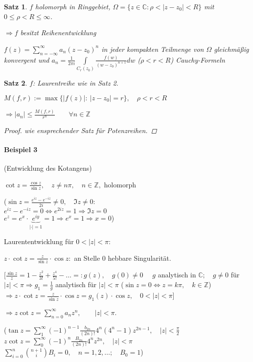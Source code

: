 \documentclass[ngerman,halfparskip]{scrartcl}
\newtheorem{satz}{Satz}[section]
\theoremstyle{definition}
\def\C{\mathbb C}
\def\Z{\mathbb Z}
\begin{document}
\begin{satz}
$f$ holomorph in Ringgebiet, $\Omega=\{z\in\C:\rho<|z-z_0|<R\}$ mit $0\leq\rho<R\leq\infty$.

$\Rightarrow f$ besitzt Reihenentwicklung

$f(z)=\sum\limits_{n=-\infty}^\infty a_{n}{(z-z_0)^n}$ in jeder kompakten Teilmenge von $\Omega$ gleichmäßig konvergent und $a_n=\frac 1 {2\pi i} \int\limits_{C_r(z_0)}\frac {f(w)}{(w-z_0)^{n+1}}dw$ ($\rho<r<R$) Cauchy-Formeln
\end{satz}

\begin{satz}
$f$: Laurentreihe wie in Satz 2. 

$M(f,r):=\max \{|f(z)|: ~|z-z_0|=r\}, \quad \rho<r<R$

$\Rightarrow |a_n|\leq \frac {M(f,r)}{r^n} \qquad \forall n\in\Z$
\begin{proof}
wie ensprechender Satz für Potenzreihen.
\end{proof}

\end{satz} 


\paragraph{Beispiel 3} (Entwicklung des Kotangens) 

$\cot z=\frac {\cos z}{\sin z}, \quad z\neq n\pi, \quad n\in\Z,$ holomorph

($\sin z=\frac{e^{iz}-e^{-iz}}{2i}\neq 0,\quad \Im z\neq 0:$\\
$e^{iz}-e^{-iz}=0 \Leftrightarrow e^{2iz}=1 \Rightarrow \Im z=0$\\
$e^z=e^x\cdot \underbrace {e^{iy}}_{|\cdot|=1}=1 \Rightarrow e^x=1 \Rightarrow x=0$)

Laurententwicklung für $0<|z|<\pi:$

$z\cdot \cot z=\frac z{\sin z}\cdot \cos z:$ an Stelle $0$ hebbare Singularität.

[$\frac{\sin z}z=1-\frac{z^2}{3!}+\frac{z^4}{5!}-\ldots=:g(z), \quad g(0)\neq 0 \quad$
$g$ analytisch in $\C; \quad g\neq 0$ für $|z|<\pi \Rightarrow g_1=\frac 1g$ analytisch für $|z|<\pi$ ($\sin z = 0 \Leftrightarrow z=k\pi, \quad k\in\Z$)\\
$\Rightarrow z\cdot \cot z= \frac z{\sin z} \cdot \cos z= g_1(z)\cdot \cos z, \quad 0<|z|<\pi$]

$\Rightarrow z\cot z = \sum\limits_{n=0}^\infty a_nz^n, \qquad |z|<\pi$.

($\tan z= \sum\limits_1^\infty (-1)^{n-1}\frac{b_{2n}}{(2n)!}4^n(4^n-1)z^{2n-1}, \quad |z|<\frac \pi 2$\\
$z\cot z=\sum\limits_0^\infty(-1)^n\frac{B_{2n}}{(2n)!}4^nz^{2n}, \quad |z|<\pi$\\
$\sum_{i=0}^n \binom{n+1}{i}B_i=0, \quad n=1,2,\ldots ; \quad B_0=1$)
\end{document}
